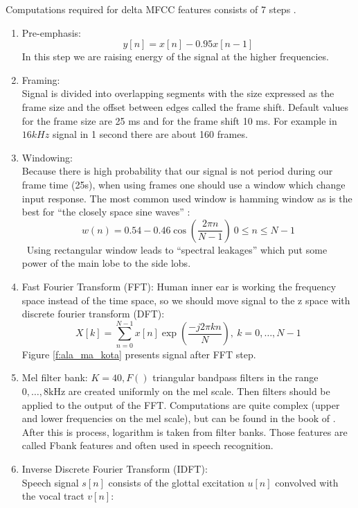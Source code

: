 Computations required for delta MFCC features consists of 7 steps \parencite{muda_voice_2010}. 

\begin{enumerate}
	\item Pre-emphasis: \\
		\begin{equation}
			y[n]=x[n]-0.95x[n-1]
		\end{equation}
		In this step we are raising energy of the signal at the higher frequencies.
	\item Framing: \\
		Signal is divided into overlapping segments with the size expressed as the frame size and the offset between edges called the frame shift. Default values for the frame size are 25 ms and for the frame shift 10 ms. For example in $16kHz$ signal in 1 second there are about 160 frames.
	\item Windowing: \\
		Because there is high probability that our signal is not period during our frame time (25s), when using frames one should use a window which change input response. The most common used window is hamming window as is the best for ``the closely space sine waves'' \parencite{national_instruments_understanding_????}:
\begin{equation}
	w(n)=0.54-0.46 \cos\left(\frac{2\pi n}{N-1} \right) \ 0 \le n \le N - 1
\end{equation}\
Using rectangular window leads to ``spectral leakages'' which put some power of the main lobe to the side lobs.	
	\item Fast Fourier Transform (FFT):
		Human inner ear is working the frequency space \parencite{jurafsky} instead of the time space, so we should move signal to the z space with discrete fourier transform (DFT): 
	\begin{equation}
		X[k]= \sum\limits^{N-1}_{n=0} x[n]\exp\left(\frac{-j2\pi kn}{N} \right), \ k=0,\ldots,N-1
	\end{equation}
	Figure \ref{f:ala_ma_kota} presents signal after FFT step.
		
	\item Mel filter bank:
		$K=40, F()$ triangular bandpass filters in the range $0,\ldots,8\text{kHz}$ are created uniformly on the mel scale. Then filters should be applied to the output of the FFT. Computations are quite complex (upper and lower frequencies on the mel scale), but can be found in the book of \textcite{huang_spoken_2001}. After this is process, logarithm is taken from filter banks. Those features are called Fbank features and often used in speech recognition.
	\item Inverse Discrete Fourier Transform (IDFT):  \\
		Speech signal $s[n]$ consists of the glottal excitation $u[n]$ convolved with the vocal tract $v[n]$:


\end{enumerate}
